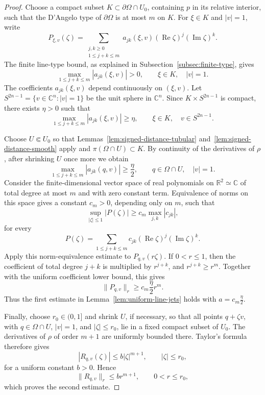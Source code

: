 \documentclass[11pt]{article}
\theoremstyle{definition}
\newcommand{\C}{\mathbb{C}}
\newcommand{\R}{\mathbb{R}}
\begin{document}
\begin{proof}
	Choose a compact subset \(K\subset\partial\Omega\cap U_0\), containing \(p\) in its relative interior, such that the D'Angelo type of \(\partial\Omega\)
	is at most \(m\) on \(K\).  For \(\xi\in K\) and \(|v|=1\), write
	\[
	P_{\xi,v}(\zeta)
	=
	\sum_{\substack{j,k\ge0\\1\le j+k\le m}}
	a_{jk}(\xi,v)
	(\operatorname{Re}\zeta)^j
	(\operatorname{Im}\zeta)^k.
	\]
	The finite line-type bound, as explained in
	Subsection~\ref{subsec:finite-type}, gives
	\begin{equation*}
		\max_{1\le j+k\le m}|a_{jk}(\xi,v)|>0,
		\qquad
		\xi\in K,\quad |v|=1.
	\end{equation*}
	The coefficients \(a_{jk}(\xi,v)\) depend continuously on
	\((\xi,v)\).  Let \(S^{2n-1}=\{v\in\C^n:|v|=1\}\) be the unit
	sphere in \(\C^n\).  Since
	\(K\times S^{2n-1}\) is compact, there exists \(\eta>0\) such that
	\[
	\max_{1\le j+k\le m}|a_{jk}(\xi,v)|
	\ge \eta,
	\qquad
	\xi\in K,\quad v\in S^{2n-1}.
	\]
	
	Choose \(U\Subset U_0\) so that
	Lemmas~\ref{lem:signed-distance-tubular}
	and~\ref{lem:signed-distance-smooth} apply and
	\(\pi(\Omega\cap U)\subset K\).
	By continuity of the derivatives of \(\rho\), after shrinking \(U\)
	once more we obtain
	\[
		\max_{1\le j+k\le m}|a_{jk}(q,v)|
		\ge \frac{\eta}{2},
		\qquad
		q\in\Omega\cap U,\quad |v|=1.
	\]
	Consider the finite-dimensional vector space of real polynomials on
	\(\R^2\simeq\C\) of total degree at most \(m\) and with zero constant
	term.  Equivalence of norms on this
	space gives a constant \(c_m>0\), depending only on \(m\), such that
	\[
		\sup_{|\zeta|\le1}|P(\zeta)|
		\ge
		c_m\max_{j,k}|c_{jk}|,
	\]
	for every
	\[
	P(\zeta)
	=
	\sum_{1\le j+k\le m}
	c_{jk}
	(\operatorname{Re}\zeta)^j
	(\operatorname{Im}\zeta)^k.
	\]
	Apply this norm-equivalence estimate to
	\(P_{q,v}(r\zeta)\).  If \(0<r\le1\), then the coefficient of total
	degree \(j+k\) is multiplied by \(r^{j+k}\), and
	\(
	r^{j+k}\ge r^m.
\)
	Together with the uniform coefficient lower bound, this gives
	\[
	\|P_{q,v}\|_r
	\ge
	c_m\frac{\eta}{2}r^m.
	\]
	Thus the first estimate in Lemma~\ref{lem:uniform-line-jets} holds with
	\(
	a=c_m\frac{\eta}{2}.
	\)
	
	Finally, choose \(r_0\in(0,1]\) and shrink \(U\), if necessary, so
	that all points \(q+\zeta v\), with \(q\in\Omega\cap U\),
	\(|v|=1\), and \(|\zeta|\le r_0\), lie in a fixed compact subset of
	\(U_0\).  The derivatives of \(\rho\) of order \(m+1\) are uniformly
	bounded there.  Taylor's formula therefore gives
	\[
	|R_{q,v}(\zeta)|
	\le
	b|\zeta|^{m+1},
	\qquad |\zeta|\le r_0,
	\]
	for a uniform constant \(b>0\).  Hence
	\[
	\|R_{q,v}\|_r\le br^{m+1},
	\qquad 0<r\le r_0,
	\]
	which proves the second estimate.
\end{proof}
\end{document}
